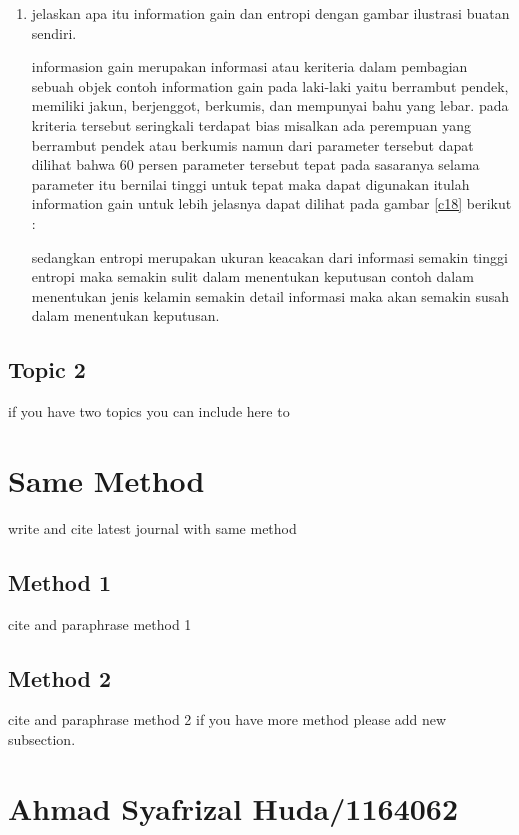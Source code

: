 \begin{enumerate}
\item jelaskan apa itu information gain dan entropi dengan gambar ilustrasi buatan sendiri.\par
informasion gain merupakan informasi atau keriteria dalam pembagian sebuah objek contoh information gain pada laki-laki yaitu berrambut pendek, memiliki jakun, berjenggot, berkumis, dan mempunyai bahu yang lebar. pada kriteria tersebut seringkali terdapat bias misalkan ada perempuan yang berrambut pendek atau berkumis namun dari parameter tersebut dapat dilihat bahwa 60 persen parameter tersebut tepat pada sasaranya selama parameter itu bernilai tinggi untuk tepat maka dapat digunakan itulah information gain untuk lebih jelasnya dapat dilihat pada gambar \ref{c18}  berikut :\par
sedangkan entropi merupakan ukuran keacakan dari informasi semakin tinggi entropi maka semakin sulit dalam menentukan keputusan contoh dalam menentukan jenis kelamin semakin detail informasi maka akan semakin susah dalam menentukan keputusan.
\end{enumerate}


\subsection{Topic 2}
if you have two topics you can include here to


\section{Same Method}
write and cite latest journal with same method

\subsection{Method 1}
cite and paraphrase method 1

\subsection{Method 2}
cite and paraphrase method 2 if you have more method please add new subsection.

\section{Ahmad Syafrizal Huda/1164062}
